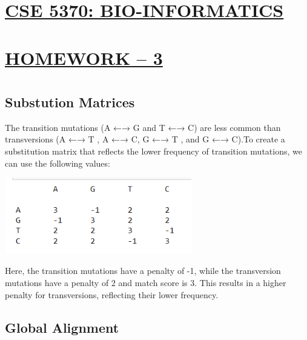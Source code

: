 \documentclass[
]{article}
\author{}
\date{}
\begin{document}
\hypertarget{cse-5370-bio-informatics}{%
\section{\texorpdfstring{\textbf{\uline{CSE 5370:
BIO-INFORMATICS}}}{CSE 5370: BIO-INFORMATICS}}\label{cse-5370-bio-informatics}}

\hypertarget{homework-3}{%
\section{\texorpdfstring{\textbf{\uline{HOMEWORK --
3}}}{HOMEWORK -- 3}}\label{homework-3}}

\hypertarget{section}{%
\section{}\label{section}}

\hypertarget{substution-matrices}{%
\subsection{\texorpdfstring{\textbf{Substution
Matrices}}{Substution Matrices}}\label{substution-matrices}}

The transition mutations (A ←→ G and T ←→ C) are less common than
transversions (A ←→ T , A ←→ C, G ←→ T , and G ←→ C).To create a
substitution matrix that reflects the lower frequency of transition
mutations, we can use the following values:

\includegraphics[width=3.20861in,height=1.30845in]{1.png}

Here, the transition mutations have a penalty of -1, while the
transversion mutations have a penalty of 2 and match score is 3. This
results in a higher penalty for transversions, reflecting their lower
frequency.

\hypertarget{global-alignment}{%
\subsection{\texorpdfstring{\textbf{Global
Alignment}}{Global Alignment}}\label{global-alignment}}
\end{document}
